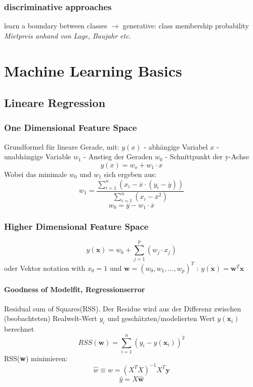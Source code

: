 \documentclass[11pt,a4paper]{article}
\begin{document}
\begin{flushleft}
\subsubsection{discriminative approaches}
learn a boundary between classes $\rightarrow$ generative: class membership probability \newline
\textit{Mietpreis anhand von Lage, Baujahr etc.}

\section{Machine Learning Basics}
\subsection{Lineare Regression}
\subsubsection{One Dimensional Feature Space}
Grundformel für lineare Gerade, mit: \newline
$y(x)$ - abhängige Variabel
$x$ - unabhängige Variable
$w_1$ - Anstieg der Geraden
$w_0$ - Schnittpunkt der y-Achse
\begin{equation}
    y(x)=w_o+w_1\cdot x
\end{equation}
Wobei das minimale $w_0$ und $w_1$ sich ergeben aus:
\begin{equation}
    w_1=\frac{\sum\limits^{n}_{i=1}(x_i-\overline{x}\cdot(y_i-\overline{y}))}{\sum\limits_{i=1}^{n}(x_i-\overline{x}^2)}
\end{equation}
\begin{equation}
    w_0=\overline{y}-w_1\cdot\overline{x}
\end{equation}
\subsubsection{Higher Dimensional Feature Space}
$$ y(\textbf{x}) = w_0 + \sum^{p}_{j=1}(w_j \cdot x_j) $$
oder Vektor notation with $x_0 = 1$ und $\textbf{w} = (w_0, w_1, ..., w_p)^T $ : $y(\textbf{x}) = \textbf{w}^T\textbf{x}$
\paragraph{Goodness of Modelfit, Regressionserror}
Residual sum of Squares(RSS). \newline
Der Residue wird aus der Differenz zwischen (beobachteten) Realwelt-Wert $y_i$ und geschätzten/modelierten Wert  $y(\mathbf{x}_i)$ berechnet
\begin{equation}
    RSS(\mathbf{w}) = \sum^{n}_{i=1}(y_i-y(\mathbf{x}_i))^2
\end{equation}
RSS(\textbf{w}) minimieren:
$$ \hat{w} \equiv w = (X^T X)^{-1} X^T \textbf{y} $$ 
$$ \hat{y} = X\boldsymbol{\hat{w}} $$


\end{flushleft}
\end{document}
